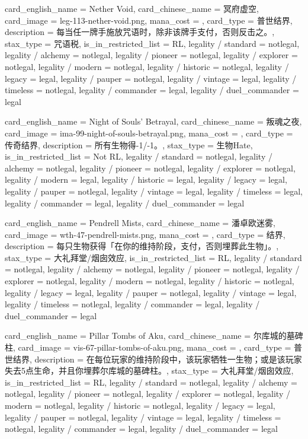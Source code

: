 \documentclass[lang = cn, color = black, 10pt]{AllThatStax}
\begin{document}
\card
{
	card_english_name = {Nether Void},
	card_chinese_name = {冥府虚空},
	card_image = leg-113-nether-void.png,
	mana_cost = ,
	card_type = 普世结界,
	description = {每当任一牌手施放咒语时，除非该牌手支付，否则反击之。},
	stax_type = 咒语税,
	is_in_restricted_list = RL,
	legality / standard = notlegal,
	legality / alchemy = notlegal,
	legality / pioneer = notlegal,
	legality / explorer = notlegal,
	legality / modern = notlegal,
	legality / historic = notlegal,
	legality / legacy = legal,
	legality / pauper = notlegal,
	legality / vintage = legal,
	legality / timeless = notlegal,
	legality / commander = legal,
	legality / duel_commander = legal
}

\card
{
	card_english_name = {Night of Souls' Betrayal},
	card_chinese_name = {叛魂之夜},
	card_image = ima-99-night-of-souls-betrayal.png,
	mana_cost = ,
	card_type = 传奇结界,
	description = {所有生物得-1/-1。},
	stax_type = 生物Hate,
	is_in_restricted_list = Not RL,
	legality / standard = notlegal,
	legality / alchemy = notlegal,
	legality / pioneer = notlegal,
	legality / explorer = notlegal,
	legality / modern = legal,
	legality / historic = legal,
	legality / legacy = legal,
	legality / pauper = notlegal,
	legality / vintage = legal,
	legality / timeless = legal,
	legality / commander = legal,
	legality / duel_commander = legal
}

\card
{
	card_english_name = {Pendrell Mists},
	card_chinese_name = {潘卓欧迷雾},
	card_image = wth-47-pendrell-mists.png,
	mana_cost = ,
	card_type = 结界,
	description = {每只生物获得「在你的维持阶段，支付，否则埋葬此生物」。},
	stax_type = 大礼拜堂/烟囱效应,
	is_in_restricted_list = RL,
	legality / standard = notlegal,
	legality / alchemy = notlegal,
	legality / pioneer = notlegal,
	legality / explorer = notlegal,
	legality / modern = notlegal,
	legality / historic = notlegal,
	legality / legacy = legal,
	legality / pauper = notlegal,
	legality / vintage = legal,
	legality / timeless = notlegal,
	legality / commander = legal,
	legality / duel_commander = legal
}

\card
{
	card_english_name = {Pillar Tombs of Aku},
	card_chinese_name = {尔库城的墓碑柱},
	card_image = vis-67-pillar-tombs-of-aku.png,
	mana_cost = ,
	card_type = 普世结界,
	description = {在每位玩家的维持阶段中，该玩家牺牲一生物；或是该玩家失去5点生命，并且你埋葬尔库城的墓碑柱。},
	stax_type = 大礼拜堂/烟囱效应,
	is_in_restricted_list = RL,
	legality / standard = notlegal,
	legality / alchemy = notlegal,
	legality / pioneer = notlegal,
	legality / explorer = notlegal,
	legality / modern = notlegal,
	legality / historic = notlegal,
	legality / legacy = legal,
	legality / pauper = notlegal,
	legality / vintage = legal,
	legality / timeless = notlegal,
	legality / commander = legal,
	legality / duel_commander = legal
}
\end{document}
